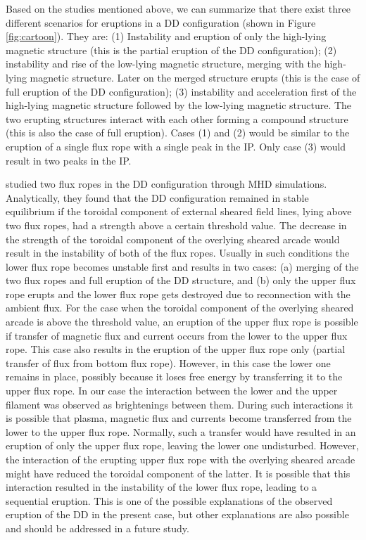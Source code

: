 \documentclass{aastex62}
\begin{document}
Based on the studies mentioned above, we can summarize that there exist three different scenarios for eruptions in a DD configuration (shown in Figure \ref{fig:cartoon}). They are: (1) Instability and eruption of only the high-lying magnetic structure (this is the partial eruption of the DD configuration); (2) instability and rise of the low-lying magnetic structure, merging with the high-lying magnetic structure. Later on the merged structure erupts (this is the case of full eruption of the DD configuration); (3) instability and acceleration first of the high-lying magnetic structure followed by the low-lying magnetic structure. The two erupting structures interact with each other forming a compound structure (this is also the case of full eruption). Cases (1) and (2) would be similar to the eruption of a single flux rope with a single peak in the IP. Only case (3) would result in two peaks in the IP.


\citet{Kliem_etal_2014} studied two flux ropes in the DD configuration through MHD simulations. Analytically, they found that the DD configuration remained in stable equilibrium if the toroidal component of external sheared field lines, lying above two flux ropes, had a strength above a certain threshold value. The decrease in the strength of the toroidal component of the overlying sheared arcade would result in the instability of both of the flux ropes. Usually in such conditions the lower flux rope becomes unstable first and results in two cases: (a) merging of the two flux ropes and full eruption of the DD structure, and (b) only the upper flux rope erupts and the lower flux rope gets destroyed due to reconnection with the ambient flux. For the case when the toroidal component of the overlying sheared arcade is above the threshold value, an eruption of the upper flux rope is possible if transfer of magnetic flux and current occurs from the lower to the upper flux rope. This case also results in the eruption of the upper flux rope only (partial transfer of flux from bottom flux rope). However, in this case the lower one remains in place, possibly because it loses free energy by transferring it to the upper flux rope. In our case the interaction between the lower and the upper filament was observed as brightenings between them. During such interactions it is possible that plasma, magnetic flux and currents become transferred from the lower to the upper flux rope. Normally, such a transfer would have resulted in an eruption of only the upper flux rope, leaving the lower one undisturbed. However, the interaction of the erupting upper flux rope with the overlying sheared arcade might have reduced the toroidal component of the latter. It is possible that this interaction resulted in the instability of the lower flux rope, leading to a sequential eruption. This is one of the possible explanations of the observed eruption of the DD in the present case, but other explanations are also possible and should be addressed in a future study.
\end{document}
